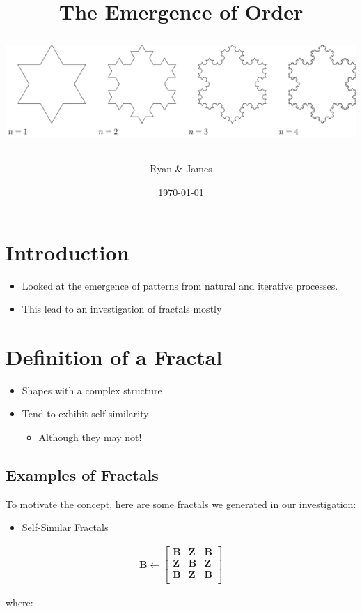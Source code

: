 \documentclass[11pt]{article}
\author{Ryan \& James}
\date{\today}
\title{The Emergence of Order \begin{center}
\includegraphics[width=.9\linewidth]{../media/tikz/Snowflake.png}
\end{center}}
\begin{document}
\maketitle

\section{Introduction}
\label{sec:org182cc5b}
\begin{itemize}
\item Looked at the emergence of patterns from natural and iterative processes.
\item This lead to an investigation of fractals mostly
\end{itemize}
\section{Definition of a Fractal}
\label{sec:org71bcd3a}
\begin{itemize}
\item Shapes with a complex structure
\item Tend to exhibit self-similarity
\begin{itemize}
\item Although they may not!
\end{itemize}
\end{itemize}

\subsection{Examples of Fractals}
\label{sec:org79fab3c}
To motivate the concept, here are some fractals we generated in our investigation:

\begin{itemize}
\item Self-Similar Fractals
\end{itemize}

\begin{align*}
\mathbf{B} \leftarrow
   \begin{bmatrix}
       \mathbf{B} & \mathbf{Z} & \mathbf{B} \\
       \mathbf{Z} & \mathbf{B} & \mathbf{Z} \\
       \mathbf{B} & \mathbf{Z} & \mathbf{B} \\
   \end{bmatrix}
\end{align*}

where:
\end{document}
